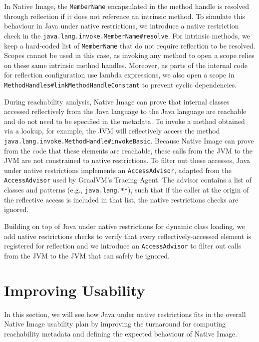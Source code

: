 In Native Image, the \verb|MemberName| encapsulated in the method handle is resolved through reflection if it does not reference an intrinsic method. To simulate this behaviour in Java under native restrictions, we introduce a native restriction check in the \verb|java.lang.invoke.MemberName#resolve|. 
For intrinsic methods, we keep a hard-coded list of \verb|MemberName| that do not require reflection to be resolved. Scopes cannot be used in this case, as invoking any method to open a scope relies on these same intrinsic method handles.
Moreover, as parts of the internal code for reflection configuration use lambda expressions, we also open a scope in \verb|MethodHandles#linkMethodHandleConstant| to prevent cyclic dependencies.

During reachability analysis, Native Image can prove that internal classes accessed reflectively from the Java language to the Java language are reachable and do not need to be specified in the metadata. 
To invoke a method obtained via a lookup, for example, the JVM will reflectively access the method \verb|java.lang.invoke.MethodHandle#invokeBasic|. Because Native Image can prove from the code that these elements are reachable, these calls from the JVM to the JVM are not constrained to native restrictions. To filter out these accesses, Java under native restrictions implements an \verb|AccessAdvisor|, adapted from the \verb|AccessAdvisor| used by GraalVM's Tracing Agent. The advisor contains a list of classes and patterns (e.g., \verb|java.lang.**|), such that if the caller at the origin of the reflective access is included in that list, the native restrictions checks are ignored.

Building on top of Java under native restrictions for dynamic class loading, we add native restrictions checks to verify that every reflectively-accessed element is registered for reflection and we introduce an \verb|AccessAdvisor| to filter out calls from the JVM to the JVM that can safely be ignored.

\section{Improving Usability}
In this section, we will see how Java under native restrictions fits in the overall Native Image usability plan by improving the turnaround for computing reachability metadata and defining the expected behaviour of Native Image. 

